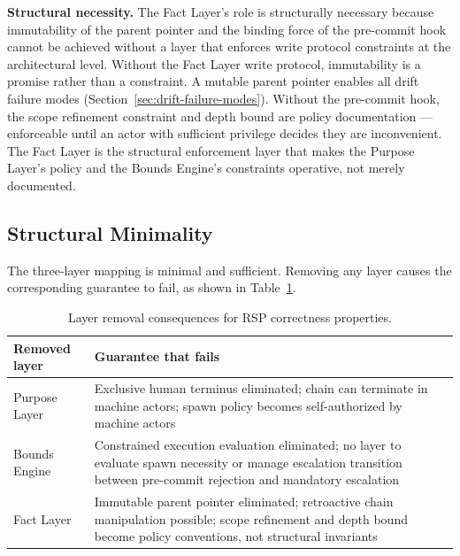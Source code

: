 \medskip
\noindent\textbf{Structural necessity.} The Fact Layer's role is structurally necessary because immutability of the parent pointer and the binding force of the pre-commit hook cannot be achieved without a layer that enforces write protocol constraints at the architectural level. Without the Fact Layer write protocol, immutability is a promise rather than a constraint. A mutable parent pointer enables all drift failure modes (Section~\ref{sec:drift-failure-modes}). Without the pre-commit hook, the scope refinement constraint and depth bound are policy documentation --- enforceable until an actor with sufficient privilege decides they are inconvenient. The Fact Layer is the structural enforcement layer that makes the Purpose Layer's policy and the Bounds Engine's constraints operative, not merely documented.

\subsection{Structural Minimality}
\label{sec:rs-minimality}

The three-layer mapping is minimal and sufficient. Removing any layer causes the corresponding guarantee to fail, as shown in Table~\ref{tab:rs-layer-minimality}.

\begin{table}[h]
\begin{center}
\begin{tabular}{p{3.4cm} p{4.6cm}}
\toprule
\textbf{Removed layer} & \textbf{Guarantee that fails} \\
\midrule
Purpose Layer & Exclusive human terminus eliminated; chain can terminate in machine actors; spawn policy becomes self-authorized by machine actors \\
Bounds Engine & Constrained execution evaluation eliminated; no layer to evaluate spawn necessity or manage escalation transition between pre-commit rejection and mandatory escalation \\
Fact Layer & Immutable parent pointer eliminated; retroactive chain manipulation possible; scope refinement and depth bound become policy conventions, not structural invariants \\
\bottomrule
\end{tabular}
\caption{Layer removal consequences for RSP correctness properties.}
\label{tab:rs-layer-minimality}
\end{center}
\end{table}

